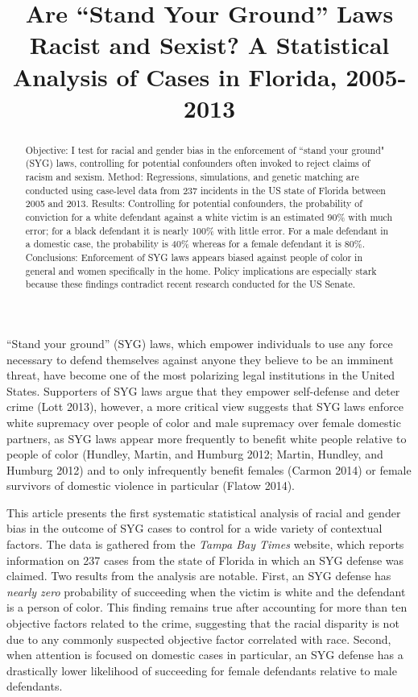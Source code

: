 \documentclass[12pt,article]{article}
\title{Are ``Stand Your Ground'' Laws Racist and Sexist? A Statistical Analysis
of Cases in Florida, 2005-2013}
\author{}
\date{}
\begin{document}
\maketitle


\begin{abstract}
Objective: I test for racial and gender bias in the enforcement of ``stand your ground" (SYG) laws, controlling for potential confounders often invoked to reject claims of racism and sexism. Method: Regressions, simulations, and genetic matching are conducted using case-level data from 237 incidents in the US state of Florida between 2005 and 2013. Results: Controlling for potential confounders, the probability of conviction for a white defendant against a white victim is an estimated 90\% with much error; for a black defendant it is nearly 100\% with little error. For a male defendant in a domestic case, the probability is 40\% whereas for a female defendant it is 80\%. Conclusions: Enforcement of SYG laws appears biased against people of color in general and women specifically in the home. Policy implications are especially stark because these findings contradict recent research conducted for the US Senate.\end{abstract}
\doublespacing

``Stand your ground'' (SYG) laws, which empower individuals to use any
force necessary to defend themselves against anyone they believe to be
an imminent threat, have become one of the most polarizing legal
institutions in the United States. Supporters of SYG laws argue that
they empower self-defense and deter crime (Lott 2013), however, a more
critical view suggests that SYG laws enforce white supremacy over people
of color and male supremacy over female domestic partners, as SYG laws
appear more frequently to benefit white people relative to people of
color (Hundley, Martin, and Humburg 2012; Martin, Hundley, and Humburg
2012) and to only infrequently benefit females (Carmon 2014) or female
survivors of domestic violence in particular (Flatow 2014).

\setlength\parindent{24pt}

This article presents the first systematic statistical analysis of
racial and gender bias in the outcome of SYG cases to control for a wide
variety of contextual factors. The data is gathered from the \emph{Tampa
Bay Times} website, which reports information on 237 cases from the
state of Florida in which an SYG defense was claimed. Two results from the analysis are notable. First, an SYG defense has \emph{nearly zero} probability of succeeding when the victim is white
and the defendant is a person of color. This finding remains true after
accounting for more than ten objective factors related to the crime,
suggesting that the racial disparity is not due to any commonly
suspected objective factor correlated with race. Second, when attention
is focused on domestic cases in particular, an SYG defense has a
drastically lower likelihood of succeeding for female defendants
relative to male defendants.
\end{document}
